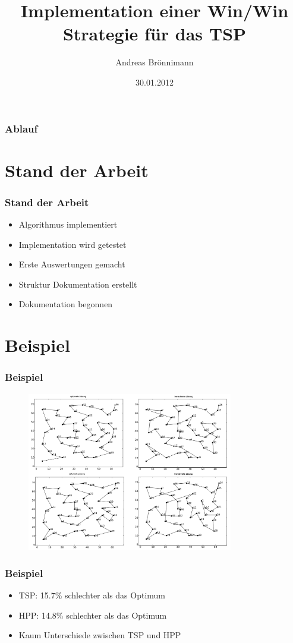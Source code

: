 \documentclass[12pt]{beamer}
\title[Design-Review Semesterarbeit]{Implementation einer Win/Win Strategie für das TSP}
\author{Andreas Brönnimann}
\institute{ZHAW - Zürcher Hochschule für Angewandte Wissenschaften}
\date{30.01.2012}
\begin{document}
    \begin{frame}
        \titlepage
    \end{frame}

    \begin{frame}
        \frametitle{Ablauf}
        \tableofcontents
    \end{frame}

    \section{Stand der Arbeit}
    \begin{frame}
        \frametitle{Stand der Arbeit}
	    \begin{itemize}
                \item Algorithmus implementiert
                \item Implementation wird getestet
                \item Erste Auswertungen gemacht
                \item Struktur Dokumentation erstellt
                \item Dokumentation begonnen
            \end{itemize}
    \end{frame}

    \section{Beispiel}
    \begin{frame}
    \frametitle{Beispiel}
        \begin{figure}[H]
	    \centering
	        \includegraphics[width=9cm]{gfx/eil51_comparison}
        \end{figure}
    \end{frame}

    \begin{frame}
        \frametitle{Beispiel}
	    \begin{itemize}
                \item TSP: 15.7\% schlechter als das Optimum
                \item HPP: 14.8\% schlechter als das Optimum
                \item Kaum Unterschiede zwischen TSP und HPP
            \end{itemize}
    \end{frame}
\end{document}
